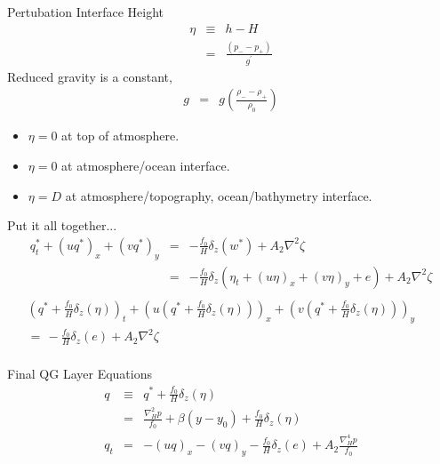 \documentclass[a4paper]{beamer}
\begin{document}
\begin{frame}{Pertubation Interface Height}
\begin{eqnarray}
\eta & \equiv & h - H\\
     & = & \frac{(p_- - p_+)}{g^\prime}
\end{eqnarray}
Reduced gravity is a constant,
\begin{eqnarray}
g & = & g\left(\frac{\rho_- - \rho_+}{\rho_0}\right)
\end{eqnarray}
\begin{itemize}
\item $\eta = 0$ at top of atmosphere.
\item $\eta = 0$ at atmosphere/ocean interface.
\item $\eta = D$ at atmosphere/topography, ocean/bathymetry interface.
\end{itemize}
\end{frame}

\begin{frame}{Put it all together...}
\begin{eqnarray}
q^*_t + \left(uq^*\right)_x + \left(vq^*\right)_y  & = & -\frac{f_0}{H}\delta_z(w^*)+ A_2\nabla^2\zeta\\
 & = & -\frac{f_0}{H}\delta_z(\eta_t + (u\eta)_x + (v\eta)_y + e)+ A_2\nabla^2\zeta\nonumber\\
 &   &
\end{eqnarray}
\begin{eqnarray}
\left(q^*  + \frac{f_0}{H}\delta_z(\eta)\right)_t + \left(u \left(q^* + \frac{f_0}{H}\delta_z(\eta)\right)\right)_x + \left(v\left(q^* + \frac{f_0}{H}\delta_z(\eta)\right)\right)_y&&\nonumber\\
=\, -\frac{f_0}{H}\delta_z(e)+ A_2\nabla^2\zeta&&\nonumber\\
&&
\end{eqnarray}
\end{frame}

\begin{frame}{Final QG Layer Equations}
\begin{eqnarray}
q & \equiv & q^* + \frac{f_0}{H}\delta_z(\eta)\\
  &    =   & \frac{\nabla^2_Hp}{f_0} + \beta(y - y_0) + \frac{f_0}{H}\delta_z(\eta)\\
q_t & = & - \left(uq\right)_x - \left(vq\right)_y  -\frac{f_0}{H}\delta_z(e)+ A_2\frac{\nabla^4_Hp}{f_0}
\end{eqnarray}
\end{frame}
\end{document}
